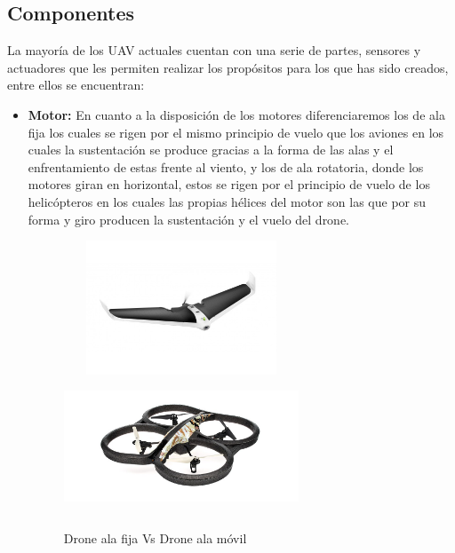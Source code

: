 \subsection{Componentes}
\hspace{1cm} La mayoría de los UAV actuales cuentan con una serie de partes, sensores y actuadores que les permiten realizar los propósitos para los que has sido creados, entre ellos se encuentran: 
	\begin{itemize}
		\item \textbf{Motor:} En cuanto a la disposición de los motores diferenciaremos los de ala fija los cuales se rigen por el mismo principio de vuelo que los aviones en los cuales la sustentación se produce gracias a la forma de las alas y el enfrentamiento de estas frente al viento, y los de ala rotatoria, donde los motores giran en horizontal, estos se rigen por el principio de vuelo de los helicópteros en los cuales las propias hélices del motor son las que por su forma y giro producen la sustentación y el vuelo del drone.
		 		
\begin{figure}[H]
 \centering
    \includegraphics[width=7cm,height=4cm]{imag/IMG15.jpeg}
    \includegraphics[width=7cm,height=4cm]{imag/IMG16.jpeg}
 \caption{Drone ala fija Vs Drone ala móvil}
 \label{f:Tipos de Drone}
\end{figure}


\end{itemize}
